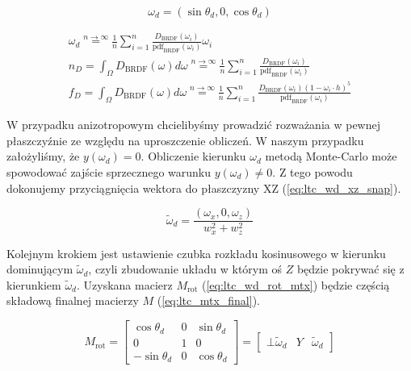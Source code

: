\documentclass[../main.tex]{subfiles}
\begin{document}
\begin{equation}
    \omega_d = \left( \sin\theta_d, 0, \cos\theta_d \right)
    \label{eq:ltc_wd_def}
\end{equation}
\noindent 

\begin{equation}
\begin{gathered}
\omega_d
\stackrel{n \rightarrow \infty}{=}
\frac{1}{n} \sum_{i=1}^{n} {
    \frac{
        D_{\text{BRDF}}(\omega_i)
    }{
        \text{pdf}_{\text{BRDF}}(\omega_i)
    }
    \omega_i
}
\\
n_D = \int_{\Omega} D_{\text{BRDF}}(\omega)d\omega
\stackrel{n \rightarrow \infty}{=}
\frac{1}{n} \sum_{i=1}^{n} {
  \frac{
    D_{\text{BRDF}}(\omega_i)
  }{
    \text{pdf}_{\text{BRDF}}(\omega_i)
  }
}
\\
f_D = \int_{\Omega} D_{\text{BRDF}}(\omega)d\omega
\stackrel{n \rightarrow \infty}{=}
\frac{1}{n} \sum_{i=1}^{n} {
    \frac{
        D_{\text{BRDF}}(\omega_i) (1 - \omega_i \cdot h)^5
    }{
        \text{pdf}_{\text{BRDF}}(\omega_i)
    }
}
\end{gathered}
\label{eq:ltc_montecarlo_equations}
\end{equation}

W przypadku anizotropowym chcielibyśmy prowadzić rozważania w pewnej płaszczyźnie ze względu na uproszczenie obliczeń. W naszym przypadku założyliśmy, że $y(\omega_d)=0$. Obliczenie kierunku $\omega_d$ metodą Monte-Carlo może spowodować zajście sprzecznego warunku $y(\omega_d) \neq 0$. Z tego powodu dokonujemy przyciągnięcia wektora do płaszczyzny XZ (\ref{eq:ltc_wd_xz_snap}).

\begin{equation}
\widetilde{\omega}_d = \frac{
    \left( \omega_x,0,\omega_z \right)
  }{
    w_x^2+w_z^2
  }
\label{eq:ltc_wd_xz_snap}
\end{equation}

Kolejnym krokiem jest ustawienie czubka rozkładu kosinusowego w kierunku dominującym $\widetilde{\omega}_d$, czyli zbudowanie układu w którym oś $Z$ będzie pokrywać się z kierunkiem $\widetilde{\omega}_d$. Uzyskana macierz $M_{\text{rot}}$ (\ref{eq:ltc_wd_rot_mtx}) będzie częścią składową finalnej macierzy $M$ (\ref{eq:ltc_mtx_final}).

\begin{equation}
M_{\text{rot}} =
\begin{bmatrix}
  \cos\theta_d  & 0     & \sin\theta_d \\
  0           & 1     & 0 \\
  -\sin\theta_d & 0     & \cos\theta_d
\end{bmatrix}
= \begin{bmatrix}
  \bot {\widetilde{\omega}_d} & Y & \widetilde{\omega}_d
\end{bmatrix}
\label{eq:ltc_wd_rot_mtx}
\end{equation}
\end{document}

